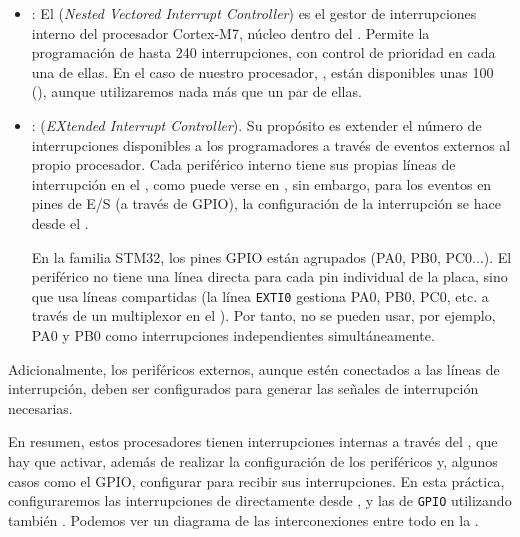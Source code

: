 \documentclass[../main.tex]{subfiles}
\begin{document}
            \begin{itemize}
                \item {}: El (\emph{Nested Vectored Interrupt Controller}) \PMMAN[4.2] es el gestor de interrupciones interno del procesador Cortex-M7, núcleo dentro del \MCU. Permite la programación de hasta 240 interrupciones, con control de prioridad en cada una de ellas. En el caso de nuestro procesador, \MCU, están disponibles unas 100 (\REFMAN[9.1.2]), aunque utilizaremos nada más que un par de ellas.
                \item {}: (\emph{EXtended Interrupt Controller}). Su propósito es extender el número de interrupciones disponibles a los programadores a través de eventos externos al propio procesador. Cada periférico interno tiene sus propias líneas de interrupción en el , como puede verse en \REFMAN[9.1.2], sin embargo, para los eventos en pines de E/S (a través de GPIO), la configuración de la interrupción se hace desde el .
                
                En la familia STM32, los pines GPIO están agrupados (PA0, PB0, PC0...). El periférico  no tiene una línea directa para cada pin individual de la placa, sino que usa líneas compartidas (la línea \texttt{EXTI0} gestiona PA0, PB0, PC0, etc. a través de un multiplexor en el ). Por tanto, no se pueden usar, por ejemplo, PA0 y PB0 como interrupciones independientes simultáneamente.
            \end{itemize}

            Adicionalmente, los periféricos externos, aunque estén conectados a las líneas de interrupción, deben ser configurados para generar las señales de interrupción necesarias.

            En resumen, estos procesadores tienen interrupciones internas a través del , que hay que activar, además de realizar la configuración de los periféricos y, algunos casos como el GPIO, configurar  para recibir sus interrupciones. En esta práctica, configuraremos las interrupciones de  directamente desde , y las de \texttt{GPIO} utilizando también . Podemos ver un diagrama de las interconexiones entre todo en la .
\end{document}
